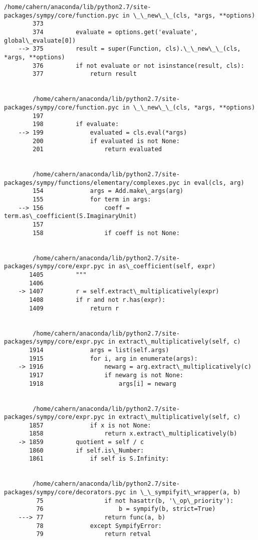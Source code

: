 \begin{Verbatim}[commandchars=\\\{\}]
        /home/cahern/anaconda/lib/python2.7/site-packages/sympy/core/function.pyc in \_\_new\_\_(cls, *args, **options)
        373 
        374         evaluate = options.get('evaluate', global\_evaluate[0])
    --> 375         result = super(Function, cls).\_\_new\_\_(cls, *args, **options)
        376         if not evaluate or not isinstance(result, cls):
        377             return result


        /home/cahern/anaconda/lib/python2.7/site-packages/sympy/core/function.pyc in \_\_new\_\_(cls, *args, **options)
        197 
        198         if evaluate:
    --> 199             evaluated = cls.eval(*args)
        200             if evaluated is not None:
        201                 return evaluated


        /home/cahern/anaconda/lib/python2.7/site-packages/sympy/functions/elementary/complexes.pyc in eval(cls, arg)
        154             args = Add.make\_args(arg)
        155             for term in args:
    --> 156                 coeff = term.as\_coefficient(S.ImaginaryUnit)
        157 
        158                 if coeff is not None:


        /home/cahern/anaconda/lib/python2.7/site-packages/sympy/core/expr.pyc in as\_coefficient(self, expr)
       1405         """
       1406 
    -> 1407         r = self.extract\_multiplicatively(expr)
       1408         if r and not r.has(expr):
       1409             return r


        /home/cahern/anaconda/lib/python2.7/site-packages/sympy/core/expr.pyc in extract\_multiplicatively(self, c)
       1914             args = list(self.args)
       1915             for i, arg in enumerate(args):
    -> 1916                 newarg = arg.extract\_multiplicatively(c)
       1917                 if newarg is not None:
       1918                     args[i] = newarg


        /home/cahern/anaconda/lib/python2.7/site-packages/sympy/core/expr.pyc in extract\_multiplicatively(self, c)
       1857             if x is not None:
       1858                 return x.extract\_multiplicatively(b)
    -> 1859         quotient = self / c
       1860         if self.is\_Number:
       1861             if self is S.Infinity:


        /home/cahern/anaconda/lib/python2.7/site-packages/sympy/core/decorators.pyc in \_\_sympifyit\_wrapper(a, b)
         75                 if not hasattr(b, '\_op\_priority'):
         76                     b = sympify(b, strict=True)
    ---> 77                 return func(a, b)
         78             except SympifyError:
         79                 return retval



\end{Verbatim}
